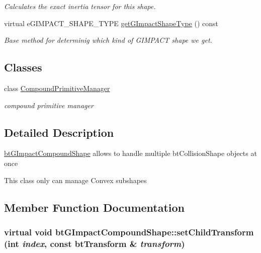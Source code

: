 \begin{CompactItemize}
\begin{CompactList}\small\item\em Calculates the exact inertia tensor for this shape. \item\end{CompactList}\item 
virtual eGIMPACT\_\-SHAPE\_\-TYPE \hyperlink{classbt_g_impact_compound_shape_861967c52cb52a358b8d99aa4c65e306}{getGImpactShapeType} () const 
\begin{CompactList}\small\item\em Base method for determinig which kind of GIMPACT shape we get. \item\end{CompactList}\end{CompactItemize}
\subsection*{Classes}
\begin{CompactItemize}
\item 
class \hyperlink{classbt_g_impact_compound_shape_1_1_compound_primitive_manager}{CompoundPrimitiveManager}
\begin{CompactList}\small\item\em compound primitive manager \item\end{CompactList}\end{CompactItemize}


\subsection{Detailed Description}
\hyperlink{classbt_g_impact_compound_shape}{btGImpactCompoundShape} allows to handle multiple btCollisionShape objects at once 

This class only can manage Convex subshapes 

\subsection{Member Function Documentation}
\hypertarget{classbt_g_impact_compound_shape_560410e20842ad73227d7712a574385c}{
\subsubsection[setChildTransform]{\setlength{\rightskip}{0pt plus 5cm}virtual void btGImpactCompoundShape::setChildTransform (int {\em index}, \/  const btTransform \& {\em transform})}}
\label{classbt_g_impact_compound_shape_560410e20842ad73227d7712a574385c}



